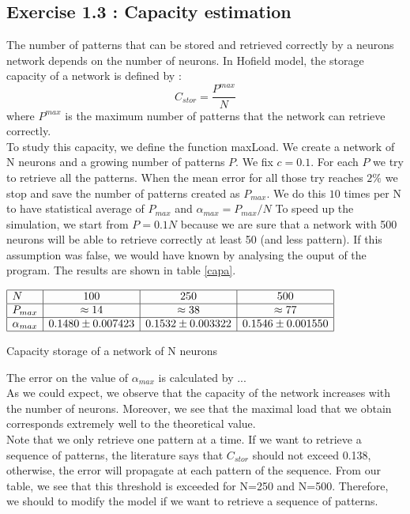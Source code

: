 \subsection{Exercise 1.3 : Capacity estimation}
The number of patterns that can be stored and retrieved correctly by a neurons network depends on the number of neurons. 
In Hofield model, the storage capacity of a network is defined by :
\begin{equation}\nonumber
C_{stor} =\frac{ P^{max}}{N}
\end{equation} 
where $P^{max}$ is the maximum number of patterns that the network can retrieve correctly. \\
To study this capacity, we define the function maxLoad. We create a network of N neurons and a growing number of patterns $P$.  
We fix $c=0.1$. For each $P$ we try to retrieve all the patterns. When the mean error for all those try reaches $2\%$ we stop and save the number 
of patterns created as $P_{max}$. We do this $10$ times per N to have statistical average of $P_{max}$ and $\alpha_{max} = P_{max}/N$
To speed up the simulation, we start from $P = 0.1 N$ because we are sure that a network with 500 neurons will be able to
retrieve correctly at least 50 (and less pattern). If this assumption was false, we would have known by analysing the ouput of the program.
The results are shown in table \ref{capa}.  
\begin{table}[h]\label{capa}
\begin{center}
\begin{math}
    \begin{array}{|l|c|c|c|}
    \hline
    N & 100 & 250 & 500 \\ \hline
    P_{max} & \approx 14 & \approx 38 &  \approx 77 \\ \hline
    \alpha_{max} & 0.1480 \pm  0.007423 & 0.1532 \pm  0.003322 &  0.1546 \pm  0.001550 \\ \hline
    \end{array}
\end{math}
\end{center}
\caption{Capacity storage of a network of N neurons }
\end{table}
The error on the value of $\alpha_{max}$ is calculated by ... \\
As we could expect, we observe that the capacity of the network increases with the number of neurons. Moreover, we see that the maximal load that we obtain corresponds extremely well to the theoretical value.\\
Note that we only retrieve one pattern at a time. If we want to retrieve a sequence of patterns, the literature says that $C_{stor}$ should not exceed 0.138\cite{prof}, otherwise, the error will propagate at each pattern of the sequence. From our table, we see that this threshold is exceeded for N=250 and N=500. Therefore, we should to modify the model if we want to retrieve a sequence of patterns. 




